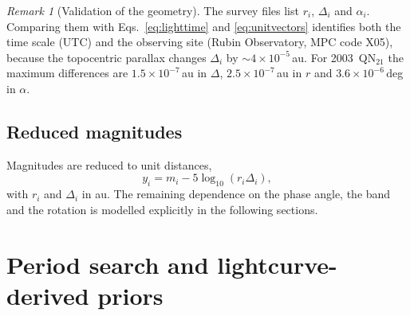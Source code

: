 \documentclass[11pt,a4paper]{article}
\theoremstyle{remark}
\newtheorem{remark}{Remark}
\begin{document}
\begin{remark}[Validation of the geometry]
The survey files list $r_i$, $\Delta_i$ and $\alpha_i$. Comparing them with Eqs.~\eqref{eq:lighttime}
and \eqref{eq:unitvectors} identifies both the time scale (UTC) and the observing site (Rubin
Observatory, MPC code X05), because the topocentric parallax changes $\Delta_i$ by
$\sim4\times10^{-5}$\,au. For 2003~QN$_{21}$ the maximum differences are $1.5\times10^{-7}$\,au in
$\Delta$, $2.5\times10^{-7}$\,au in $r$ and $3.6\times10^{-6}$\,deg in $\alpha$.
\end{remark}

\subsection{Reduced magnitudes}
Magnitudes are reduced to unit distances,
\begin{equation}
  y_i = m_i - 5\log_{10}(r_i\Delta_i),
  \label{eq:reduced}
\end{equation}
with $r_i$ and $\Delta_i$ in au. The remaining dependence on the phase angle, the band and the
rotation is modelled explicitly in the following sections.

\section{Period search and lightcurve-derived priors}
\label{sec:period}
\end{document}

